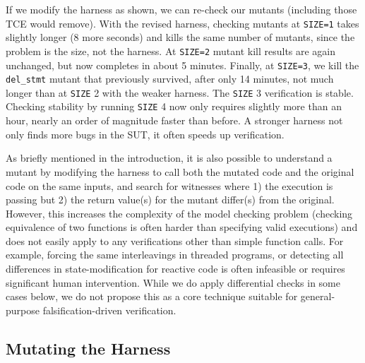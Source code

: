 \documentclass[conference]{IEEEtran}
\begin{document}
If we modify the harness as shown, we can re-check our mutants
(including those TCE would remove).  With the revised harness,
checking mutants at {\tt SIZE=1} takes slightly longer (8 more
seconds) and kills the same number of mutants, since the problem is
the size, not the harness.  At {\tt SIZE=2} mutant kill results are
again unchanged, but now completes in about 5 minutes.  Finally, at
{\tt SIZE=3}, we kill the {\tt del\_stmt} mutant that previously
survived, after only 14 minutes, not much longer than at {\tt SIZE} 2
with the weaker harness.  The {\tt SIZE} 3 verification is stable.
Checking stability by running {\tt SIZE} 4 now only requires slightly
more than an hour, nearly an order of magnitude faster than before.  A stronger harness not only finds more bugs in the
SUT, it often speeds up verification.


As briefly mentioned in the introduction, it is also possible to
understand a mutant by modifying the harness to call both the mutated
code and the original code on the same inputs, and search for
witnesses where 1) the execution is passing but 2) the return value(s)
for the mutant differ(s) from the original.  However, this
increases the complexity of the model checking problem (checking
equivalence of two functions is often harder than
specifying valid executions) and does not easily apply to any
verifications other than simple function calls.  For example, forcing
the same interleavings in threaded programs, or detecting all
differences in state-modification for reactive code is often
infeasible or requires significant human intervention.  While we do
apply differential checks in some cases below, we do not propose this
as a core technique suitable for general-purpose falsification-driven
verification.

\subsection{Mutating the Harness}
\label{sec:checkharness}
\end{document}
